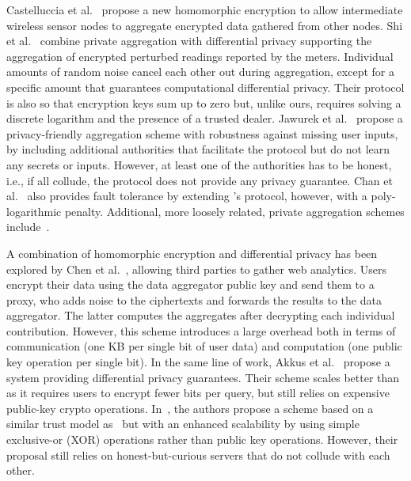 \documentclass[conference]{IEEEtran}
\begin{document}
Castelluccia et al.~\cite{Mobiquitous05} propose a new homomorphic encryption to allow intermediate wireless sensor nodes to aggregate encrypted data gathered from other nodes.  Shi et al.~\cite{shi2011privacy} combine private aggregation with differential privacy supporting the aggregation of encrypted perturbed readings reported by the meters. Individual amounts of random noise cancel each other out during aggregation, except for a specific amount that guarantees computational differential privacy. Their protocol is also so that encryption keys sum up to zero but, unlike ours, requires solving a discrete logarithm and the presence of a trusted dealer. 
Jawurek et al.~\cite{jawurek2012fault} propose a privacy-friendly aggregation scheme with robustness against missing user inputs, by including additional authorities that facilitate the protocol but do not learn any secrets or inputs.
However, at least one of the authorities has to be honest, i.e., if all collude, the protocol does not provide any privacy guarantee.
Chan et al.~\cite{chan2012privacy} also provides fault tolerance by extending 
\cite{shi2011privacy}'s protocol, however, with a poly-logarithmic penalty. 
Additional, more loosely related, private aggregation schemes include~\cite{Mobiquitous05,erkin2012private,bilogrevic2014s}. 


A combination of homomorphic encryption and differential privacy has  been explored by Chen et al.~\cite{chen2012towards}, allowing third parties to gather web analytics.
Users encrypt their data using the data aggregator public key and send them to a proxy, who adds noise to the ciphertexts and forwards the results to the data aggregator. The latter computes the aggregates after decrypting each individual contribution.
However, this scheme introduces a large overhead both in terms of communication (one KB per single bit of user data) and computation (one public key operation per single bit).
In the same line of work, Akkus et al.~\cite{akkus2012non} propose a system providing differential privacy guarantees. 
Their scheme scales better than~\cite{chen2012towards} as it requires users to encrypt fewer bits per query, but still relies on expensive public-key crypto operations.
In~\cite{chen2013splitx}, the authors propose a scheme based on a similar trust model as~\cite{chen2012towards} but with an enhanced scalability by using simple exclusive-or (XOR) operations rather than public key operations. However, their proposal still relies on honest-but-curious servers that do not collude with each other.
\end{document}
